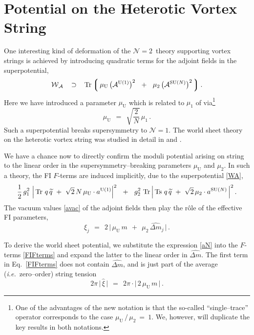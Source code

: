 \documentclass[12pt]{article}
\def\beq{\begin{equation}}
\def\eeq{\end{equation}}
\newcommand{\ntwon}{${\mathcal N}=2$}
\newcommand{\nonen}{${\mathcal N}=1$}
\newcommand{\wt}{\widetilde}
\newcommand{\mc}[1]{\mathcal{#1}}
\newcommand{\mw}{\mathcal{W}}
\newcommand{\ma}{\mathcal{A}}
\newcommand{\lgr}{\left\lgroup}
\newcommand{\rgr}{\right\rgroup}
\newcommand{\AU}{\mc{A}^{\rm U(1)}}
\newcommand{\AN}{\mc{A}^\text{SU($N$)}}
\newcommand{\aU}{a^{\rm U(1)}}
\newcommand{\aN}{a^\text{SU($N$)}}
\newcommand{\muU}{\mu_\text{U}}
\newcommand{\qt}{\wt{q}}
\newcommand{\Tr}{\text{Tr}}
\newcommand{\Ts}{\text{Ts}}
\newcommand{\dm}{\hat{{\scriptstyle \Delta} m}}
\newcommand{\ie}{{\it i.e.}~}
\begin{document}
\section{Potential on the Heterotic Vortex String}

	One interesting kind of deformation of the \ntwon\, theory supporting vortex strings is
	achieved by introducing quadratic terms for the adjoint fields in the superpotential,
\beq
\label{WA}
	\mw{}_\ma    ~~\:\supset\:~~    \Tr \lgr\, \muU\, \big( \AU \big)^2   ~~+~~  \mu_2\, \big( \AN \big)^2 \,\rgr.
\eeq
	Here we have introduced a parameter $ \muU $ which is related to $ \mu_1 $ of \cite{SY1} via\footnote{
		One of the advantages of the new notation is that the so-called ``single--trace'' operator
		corresponds to the case $ \muU \,/\, \mu_2  ~=~ 1 $.
		We, however, will duplicate the key results in both notations.}
\beq
	\muU    ~~=~~ \sqrt{\frac{2}{N}}\, \mu_1\,.
\eeq
	Such a superpotential breaks supersymmetry to \nonen. 
	The world sheet theory on the heterotic vortex string was studied in detail in \cite{BSY3} and \cite{Shifman:2010kr}.

	We have a chance now to directly confirm the moduli potential arising on string to the linear order
	in the supersymmetry--breaking parameters $ \muU $ and $ \mu_2 $.
	In such a theory, the FI $ F $-terms are induced implicitly, due to the superpotential \eqref{WA},
\beq
\label{FIFterms}
	\frac{1}{2}\,g_1^2~ \Big|\, \Tr~ q\, \qt ~+~ \sqrt{2}\, N\, \muU \cdot \aU \Big|^2
	~~+~~
	g_2^2~ \Tr\, \Big|\, \Ts~ q\, \qt ~+~ \sqrt{2}\, \mu_2 \cdot \aN \,\Big|^2\,.
\eeq
	The vacuum values \eqref{avac} of the adjoint fields then play the r\^ole of the effective FI parameters,
\beq
\label{xij}
	\xi_j    ~~=~~    2\, \Big|\, \muU\,m  ~~+~~  \mu_2\,\dm{}_j \,\Big|\,.
\eeq

	To derive the world sheet potential, we substitute the expression \eqref{aN} into the $ F $-terms
	\eqref{FIFterms} and expand the latter to the linear order in $ \dm $.
	The first term in Eq.~\eqref{FIFterms} does not contain $ \dm $, 
	and is just part of the average (\ie zero--order) string tension
\beq
\label{avtension}
	2 \pi\, \big|\, \hat{\xi} \,\big|    ~~=~~    2 \pi \cdot \Big|\, 2\, \muU\, m \,\Big| \,.
\eeq
	
\end{document}
